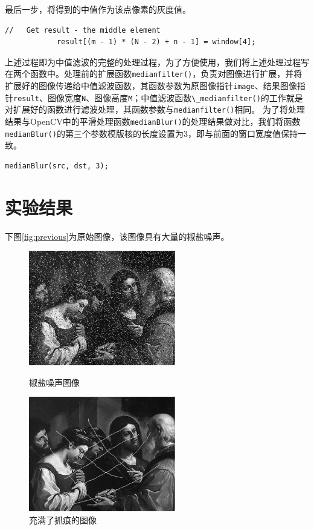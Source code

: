 \documentclass[a4paper]{ctexrep}
\begin{document}
最后一步，将得到的中值作为该点像素的灰度值。

\begin{lstlisting}
//   Get result - the middle element
			result[(m - 1) * (N - 2) + n - 1] = window[4];
\end{lstlisting}

上述过程即为中值滤波的完整的处理过程，为了方便使用，我们将上述处理过程写在两个函数中。处理前的扩展函数\lstinline{medianfilter()}，负责对图像进行扩展，并将扩展好的图像传递给中值滤波函数，其函数参数为原图像指针\lstinline{image}、结果图像指针\lstinline{result}、图像宽度\lstinline{N}、图像高度\lstinline{M}；中值滤波函数\lstinline{\_medianfilter()}的工作就是对扩展好的函数进行滤波处理，其函数参数与\lstinline{medianfilter()}相同。
为了将处理结果与OpenCV中的平滑处理函数\lstinline{medianBlur()}的处理结果做对比，我们将函数\lstinline{medianBlur()}的第三个参数模版核的长度设置为3，即与前面的窗口宽度值保持一致。

\begin{lstlisting}
medianBlur(src, dst, 3);
\end{lstlisting}

\section{实验结果}

下图\ref {fig:previous}为原始图像，该图像具有大量的椒盐噪声。

\begin{figure}[h]
\centering
\begin{varwidth}[t]{\textwidth}
\vspace{0pt}
\centering
\includegraphics[height=5cm]{img/impulseNoise.pdf}
\caption{椒盐噪声图像}
\label {fig:previous}
\end{varwidth}%
\quad
\begin{varwidth}[t]{\textwidth}
\vspace{0pt}
\centering
\includegraphics[height=5cm]{img/scratchNoises.pdf}
\caption{充满了抓痕的图像}
\label{fig:scratchedImg}
\end{varwidth}
\end{figure}
\end{document}
